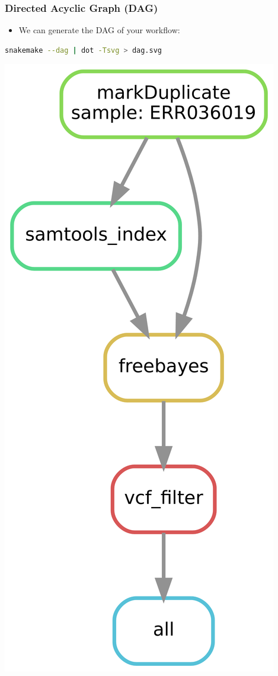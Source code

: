 \documentclass{beamer}
\begin{document}
\begin{frame}[fragile]
    \frametitle{Directed Acyclic Graph (DAG)}
    \begin{itemize}
        \item We can generate the DAG of your workflow:
    \end{itemize}
    \begin{lstlisting}[language=bash]
        snakemake --dag | dot -Tsvg > dag.svg
    \end{lstlisting}
    \begin{center}
        \includegraphics[scale=0.05]{dag_one_sample.png}
    \end{center}
\end{frame}
\end{document}
